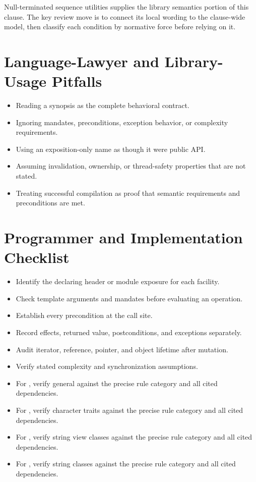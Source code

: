 \documentclass[11pt,letterpaper]{article}
\begin{document}
\begin{CornellReferenceSummaryBox}Null-terminated sequence utilities supplies the library semantics portion of this clause. The key review move is to connect its local wording to the clause-wide model, then classify each condition by normative force before relying on it.\end{CornellReferenceSummaryBox}
\section{Language-Lawyer and Library-Usage Pitfalls}
\begin{CornellReferencePitfallBox}\begin{itemize}[label=\textcolor{CornellReferenceAmber}{$\blacktriangleright$}]
\item Reading a synopsis as the complete behavioral contract.
\item Ignoring mandates, preconditions, exception behavior, or complexity requirements.
\item Using an exposition-only name as though it were public API.
\item Assuming invalidation, ownership, or thread-safety properties that are not stated.
\item Treating successful compilation as proof that semantic requirements and preconditions are met.
\end{itemize}\end{CornellReferencePitfallBox}
\section{Programmer and Implementation Checklist}
\begin{CornellReferenceChecklistBox}\begin{itemize}[label=$\square$]
\item Identify the declaring header or module exposure for each facility.
\item Check template arguments and mandates before evaluating an operation.
\item Establish every precondition at the call site.
\item Record effects, returned value, postconditions, and exceptions separately.
\item Audit iterator, reference, pointer, and object lifetime after mutation.
\item Verify stated complexity and synchronization assumptions.
\item For , verify general against the precise rule category and all cited dependencies.
\item For , verify character traits against the precise rule category and all cited dependencies.
\item For , verify string view classes against the precise rule category and all cited dependencies.
\item For , verify string classes against the precise rule category and all cited dependencies.
\end{itemize}\end{CornellReferenceChecklistBox}
\end{document}
